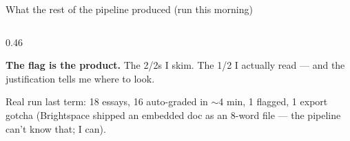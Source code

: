 \begin{frame}{What the rest of the pipeline produced (run this morning)}
\begin{columns}[T]
\begin{column}{0.46\textwidth}
\begin{tcolorbox}[pipelinebox, title={\faFileCsv\quad reconcile.py --- names go back on}, top=2pt, bottom=2pt]
\end{tcolorbox}
\vskip3pt
\begin{tcolorbox}[accentbox, top=3pt, bottom=3pt]
\small \textbf{The flag is the product.} The 2/2s I skim. The 1/2 I actually read --- and the justification tells me where to look.
\end{tcolorbox}
\vskip3pt
\begin{tcolorbox}[quotebox, top=2pt, bottom=2pt]
\scriptsize Real run last term: 18 essays, 16 auto-graded in $\sim$4 min, 1 flagged, 1 export gotcha (Brightspace shipped an embedded doc as an 8-word file --- the pipeline can't know that; I can).
\end{tcolorbox}
\end{column}
\end{columns}
\end{frame}


